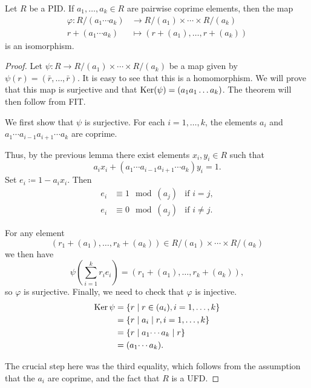 \documentclass[10pt, a4paper]{article}
\begin{document}
\begin{theorem}
    Let $R$ be a PID.
    If $a_1, \dotsc, a_k \in R$ are pairwise coprime elements,
    then the map
    \begin{align*}
        \varphi : R / (a_1 \dotsi a_k) &\to R / (a_1) \times \dotsi \times R / (a_k) \\
        r + (a_1 \dotsi a_k) &\mapsto (r + (a_1), \dotsc, r + (a_k))
    \end{align*}
    is an isomorphism.

    \begin{proof}
        Let $\psi : R \to R / (a_1) \times \dotsi \times R / (a_k)$ be a map given by $\psi(r) = (\bar{r}, \dotsc, \bar{r})$.
        It is easy to see that this is a homomorphism.
        We will prove that this map is surjective and that $\operatorname{Ker}(\psi) = (a_1a_1\dotsc a_k)$.
        The theorem will then follow from FIT.

        We first show that $\psi$ is surjective.
        For each $i = 1, \dotsc, k$,
        the elements $a_i$ and $a_1 \dotsi a_{i - 1}a_{i + 1}\dotsi a_k$ are coprime.

        Thus,
        by the previous lemma there exist elements $x_i, y_i \in R$ such that
        \[
        a_ix_i + (a_1 \dotsi a_{i - 1}a_{i + 1} \dotsi a_k)y_i = 1.
        \]
        Set $e_i \coloneqq 1 - a_ix_i$.
        Then
        \begin{align*}
            e_i &\equiv 1\mod{(a_j)} &\text{if } i = j, \\
            e_i &\equiv 0\mod{(a_j)} &\text{if } i \neq j.
        \end{align*}

        For any element
        \[
        (r_1 + (a_1), \dotsc, r_k + (a_k)) \in R / (a_1) \times \dotsi \times R / (a_k)
        \]
        we then have
        \[
        \psi\left(\sum_{i = 1}^{k}r_ie_i\right) = (r_1 + (a_1), \dotsc, r_k + (a_k)),
        \]
        so $\varphi$ is surjective.
        Finally,
        we need to check that $\varphi$ is injective.
        \begin{align*}
            \operatorname{Ker}{\psi} &= \{r \mid r \in (a_i), i = 1, \dotsc, k\} \\
            &= \{r \mid a_i \mid r, i = 1, \dotsc, k\} \\
            &= \{r \mid a_1 \dotsi a_k \mid r\} \\
            &= (a_1 \dotsi a_k).
        \end{align*}

        The crucial step here was the third equality,
        which follows from the assumption that the $a_i$ are coprime,
        and the fact that $R$ is a UFD.
    \end{proof}
\end{theorem}
\end{document}
